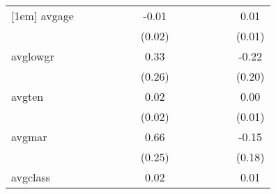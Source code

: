 \documentclass{article}
\begin{document}
{\begin{tabular}{l*{12}{c}}
[1em]
avgage      &                     &                     &                     &                     &                     &       -0.01         &                     &                     &                     &                     &                     &        0.01         \\
            &                     &                     &                     &                     &                     &      (0.02)         &                     &                     &                     &                     &                     &      (0.01)         \\
[1em]
avglowgr    &                     &                     &                     &                     &                     &        0.33         &                     &                     &                     &                     &                     &       -0.22         \\
            &                     &                     &                     &                     &                     &      (0.26)         &                     &                     &                     &                     &                     &      (0.20)         \\
[1em]
avgten      &                     &                     &                     &                     &                     &        0.02         &                     &                     &                     &                     &                     &        0.00         \\
            &                     &                     &                     &                     &                     &      (0.02)         &                     &                     &                     &                     &                     &      (0.01)         \\
[1em]
avgmar      &                     &                     &                     &                     &                     &        0.66\sym{***}&                     &                     &                     &                     &                     &       -0.15         \\
            &                     &                     &                     &                     &                     &      (0.25)         &                     &                     &                     &                     &                     &      (0.18)         \\
[1em]
avgclass    &                     &                     &                     &                     &                     &        0.02         &                     &                     &                     &                     &                     &        0.01         \\

\end{tabular}}
\end{document}
